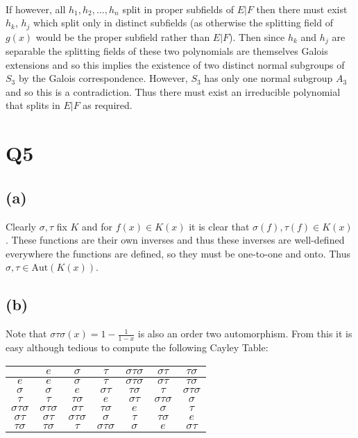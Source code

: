\documentclass{article}
\begin{document}
\paragraph{}
If however, all $h_1,h_2,\dots,h_n$ split in proper subfields of $E|F$ then there must exist $h_k$, $h_j$ 
which split only in distinct subfields (as otherwise the splitting field of $g(x)$ would be 
the proper subfield rather than $E|F$). Then since $h_k$ and $h_j$ are separable the splitting fields 
of these two polynomials are themselves Galois extensions and so this implies the existence of 
two distinct normal subgroups of $S_3$ by the Galois correspondence. However, $S_3$ has only one normal 
subgroup $A_3$ and so this is a contradiction. Thus there must exist an irreducible polynomial 
that splits in $E|F$ as required.

\section*{Q5}
\subsection*{(a)}
Clearly $\sigma,\tau$ fix $K$ and for $f(x) \in K(x)$ it is clear that $\sigma(f), \tau(f) \in K(x)$. 
These functions are their own inverses and thus these inverses are well-defined everywhere 
the functions are defined, so they must be one-to-one and onto. Thus $\sigma,\tau \in \text{Aut}(K(x))$. 

\subsection*{(b)}
Note that $\sigma\tau\sigma(x) = 1 - \frac{1}{1-x}$ is also an order two automorphism. From this it 
is easy although tedious to compute the following Cayley Table:

\begin{center}
    \begin{tabular}{ c | c c c c c c } 
    & $e$ & $\sigma$ & $\tau$ & $\sigma\tau\sigma$ & $\sigma\tau$ & $\tau\sigma$ \\
    \hline
    $e$ & $e$ & $\sigma$ & $\tau$ & $\sigma\tau\sigma$ & $\sigma\tau$ & $\tau\sigma$ \\
    $\sigma$ & $\sigma$ & $e$ & $\sigma\tau$ & $\tau\sigma$ & $\tau$ & $\sigma\tau\sigma$ \\
    $\tau$ & $\tau$ & $\tau\sigma$ & $e$ & $\sigma\tau$ & $\sigma\tau\sigma$ & $\sigma$ \\
    $\sigma\tau\sigma$ & $\sigma\tau\sigma$ & $\sigma\tau$ & $\tau\sigma$ & $e$ & $\sigma$ & $\tau$ \\
    $\sigma\tau$ & $\sigma\tau$ & $\sigma\tau\sigma$ & $\sigma$ & $\tau$ & $\tau\sigma$ & $e$ \\
    $\tau\sigma$ & $\tau\sigma$ & $\tau$ & $\sigma\tau\sigma$ & $\sigma$ & $e$ & $\sigma\tau$ 
    \end{tabular}
\end{center}
\end{document}
